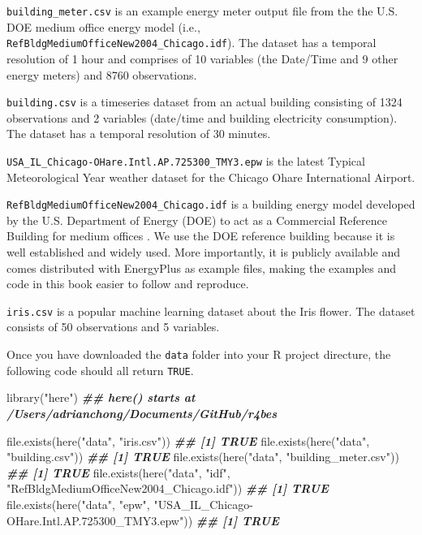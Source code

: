 \documentclass[
]{book}
\newenvironment{Shaded}{\begin{snugshade}}{\end{snugshade}}
\newcommand{\DocumentationTok}[1]{\textcolor[rgb]{0.56,0.35,0.01}{\textbf{\textit{#1}}}}
\newcommand{\FunctionTok}[1]{\textcolor[rgb]{0.00,0.00,0.00}{#1}}
\newcommand{\NormalTok}[1]{#1}
\newcommand{\StringTok}[1]{\textcolor[rgb]{0.31,0.60,0.02}{#1}}
\begin{document}
\texttt{building\_meter.csv} is an example energy meter output file from the the U.S. DOE medium office energy model (i.e., \texttt{RefBldgMediumOfficeNew2004\_Chicago.idf}). The dataset has a temporal resolution of 1 hour and comprises of 10 variables (the Date/Time and 9 other energy meters) and 8760 observations.

\texttt{building.csv} is a timeseries dataset from an actual building consisting of 1324 observations and 2 variables (date/time and building electricity consumption). The dataset has a temporal resolution of 30 minutes.

\texttt{USA\_IL\_Chicago-OHare.Intl.AP.725300\_TMY3.epw} is the latest Typical Meteorological Year weather dataset for the Chicago Ohare International Airport.

\texttt{RefBldgMediumOfficeNew2004\_Chicago.idf} is a building energy model developed by the U.S. Department of Energy (DOE) to act as a Commercial Reference Building for medium offices \citep{deru_us_2011}. We use the DOE reference building because it is well established and widely used. More importantly, it is publicly available and comes distributed with EnergyPlus as example files, making the examples and code in this book easier to follow and reproduce.

\texttt{iris.csv} is a popular machine learning dataset about the Iris flower. The dataset consists of 50 observations and 5 variables.

Once you have downloaded the \texttt{data} folder into your R project directure, the following code should all return \texttt{TRUE}.

\begin{Shaded}
\begin{Highlighting}[]
\FunctionTok{library}\NormalTok{(}\StringTok{"here"}\NormalTok{)}
\DocumentationTok{\#\# here() starts at /Users/adrianchong/Documents/GitHub/r4bes}

\FunctionTok{file.exists}\NormalTok{(}\FunctionTok{here}\NormalTok{(}\StringTok{"data"}\NormalTok{, }\StringTok{"iris.csv"}\NormalTok{))}
\DocumentationTok{\#\# [1] TRUE}
\FunctionTok{file.exists}\NormalTok{(}\FunctionTok{here}\NormalTok{(}\StringTok{"data"}\NormalTok{, }\StringTok{"building.csv"}\NormalTok{))}
\DocumentationTok{\#\# [1] TRUE}
\FunctionTok{file.exists}\NormalTok{(}\FunctionTok{here}\NormalTok{(}\StringTok{"data"}\NormalTok{, }\StringTok{"building\_meter.csv"}\NormalTok{))}
\DocumentationTok{\#\# [1] TRUE}
\FunctionTok{file.exists}\NormalTok{(}\FunctionTok{here}\NormalTok{(}\StringTok{"data"}\NormalTok{, }\StringTok{"idf"}\NormalTok{, }\StringTok{"RefBldgMediumOfficeNew2004\_Chicago.idf"}\NormalTok{))}
\DocumentationTok{\#\# [1] TRUE}
\FunctionTok{file.exists}\NormalTok{(}\FunctionTok{here}\NormalTok{(}\StringTok{"data"}\NormalTok{, }\StringTok{"epw"}\NormalTok{, }\StringTok{"USA\_IL\_Chicago{-}OHare.Intl.AP.725300\_TMY3.epw"}\NormalTok{))}
\DocumentationTok{\#\# [1] TRUE}
\end{Highlighting}
\end{Shaded}
\end{document}
